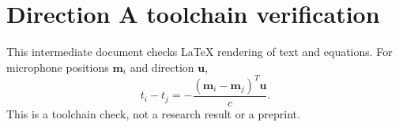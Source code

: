 \documentclass[10pt]{article}
\begin{document}
\section*{Direction A toolchain verification}
This intermediate document checks LaTeX rendering of text and equations.
For microphone positions $\mathbf m_i$ and direction $\mathbf u$,
\[
  t_i-t_j=-\frac{(\mathbf m_i-\mathbf m_j)^T\mathbf u}{c}.
\]
This is a toolchain check, not a research result or a preprint.
\end{document}
